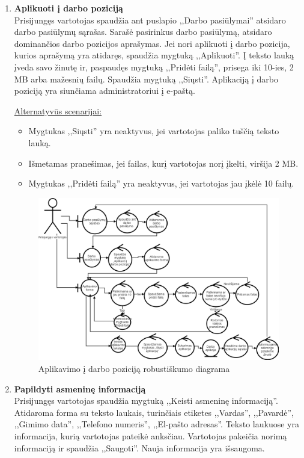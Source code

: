 \documentclass{VUMIFPSkursinis}
\begin{document}
\begin{enumerate} [label = \textbf{U\arabic*.}]
			\item \textbf{Aplikuoti į darbo poziciją} \\
				Prisijungęs vartotojas spaudžia ant puslapio ,,Darbo pasiūlymai'' atsidaro darbo pasiūlymų sąrašas. Sarašė pasirinkus darbo pasiūlymą, atsidaro dominančios darbo pozicijos aprašymas. Jei nori aplikuoti į darbo pozicija, kurios aprašymą yra atidaręs, spaudžia mygtuką ,,Aplikuoti''. Į teksto lauką įveda savo žinutę ir, paspaudęs mygtuką ,,Pridėti failą'', prisega iki 10-ies, 2 MB arba mažesnių failų. Spaudžia mygtuką ,,Siųsti''. Aplikaciją į darbo poziciją yra siunčiama administratoriui į e-paštą.
				
				\underline{Alternatyvūs scenarijai:}
				\begin{itemize}
					\item Mygtukas ,,Siųsti'' yra neaktyvus, jei vartotojas paliko tuščią teksto lauką.
					\item Išmetamas pranešimas, jei failas, kurį vartotojas norį įkelti, viršija 2 MB.
					\item Mygtukas ,,Pridėti failą'' yra neaktyvus, jei vartotojas jau įkėlė 10 failų.
				\end{itemize}
				
				\begin{figure}[H]
					\centering
					\includegraphics[width=\textwidth]{img/PSI5/U15.png}
					\caption{Aplikavimo į darbo poziciją robustiškumo diagrama}
					\label{draw:u15}
				\end{figure}
				
			\item \textbf{Papildyti asmeninę informaciją} \\
				Prisijungęs vartotojas spaudžia mygtuką ,,Keisti asmeninę informaciją''. Atidaroma forma su teksto laukais, turinčiais etiketes ,,Vardas'', ,,Pavardė'', ,,Gimimo data'', ,,Telefono numeris'', ,,El-pašto adresas''. Teksto laukuose yra informacija, kurią vartotojas pateikė anksčiau. Vartotojas pakeičia norimą informaciją ir spaudžia ,,Saugoti''. Nauja informacija yra išsaugoma.
				

\end{enumerate}
\end{document}
